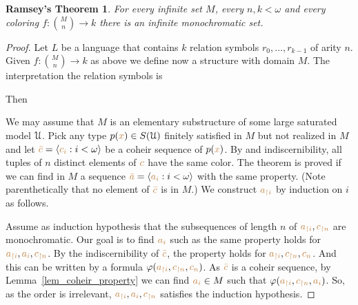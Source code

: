 \documentclass[creche.tex]{subfiles}
\begin{document}
\theoremstyle{mio}
\newtheorem{Ramsey}[thm]{Ramsey's Theorem}
\begin{Ramsey}\label{thm_Ramsey}
For every infinite set $M$, every $n,k<\omega$ and every coloring $f:{M\choose n}\to k$ there is an infinite monochromatic set.
\end{Ramsey}
\begin{proof}
Let $L$ be a language that contains $k$ relation symbols $r_0,\dots,r_{k-1}$ of arity $n$. Given $f:{M\choose n}\to k$ as above we define now a structure with domain $M$. The interpretation the relation symbols is




Then



We may assume that $M$ is an elementary substructure of some large saturated model $\EuScript U$. Pick any type $p({\color{brown} x})\in S(\EuScript U)$ finitely satisfied in $M$ but not realized in $M$ and let ${\color{brown}\bar c}=\langle{\color{brown}c_i}:i<\omega\rangle$ be a coheir sequence of $p({\color{brown} x})$. By \ssf{\#} and indiscernibility, all tuples of $n$ distinct elements of ${\color{brown} c}$ have the same color. The theorem is proved if we can find in $M$ a sequence ${\color{brown}\bar a}=\langle{\color{brown}a_i}:i<\omega\rangle$ with the same property. (Note parenthetically that no element of ${\color{brown}\bar c}$ is in $M$.) We construct ${\color{brown} a_{\restriction i}}$ by induction on $i$ as follows. 

Assume as induction hypothesis that the subsequences of length $n$ of ${\color{brown} a_{\restriction i}},{\color{brown} c_{\restriction n}}$ are monochromatic. Our goal is to find ${\color{brown} a_i}$ such as the same property holds for ${\color{brown} a_{\restriction i}},{\color{brown} a_i},{\color{brown} c_{\restriction n}}$. By the indiscernibility of ${\color{brown}\bar c}$, the property holds for  ${\color{brown} a_{\restriction i}},{\color{brown} c_{\restriction n}},{\color{brown}{c_n}}$.  And this can be written by a formula $\varphi({\color{brown} a_{\restriction i}},{\color{brown} c_{\restriction n}},{\color{brown}{c_n}})$. As ${\color{brown}\bar c}$ is a coheir sequence, by Lemma~\ref{lem_coheir_property} we can find  ${\color{brown} a_i}\in M$ such that  $\varphi({\color{brown} a_{\restriction i}},{\color{brown} c_{\restriction n}},{\color{brown} a_i})$. So, as the order is irrelevant,  ${\color{brown} a_{\restriction i}},{\color{brown} a_i},{\color{brown} c_{\restriction n}}$ satisfies the induction hypothesis.
\end{proof}
\end{document}
